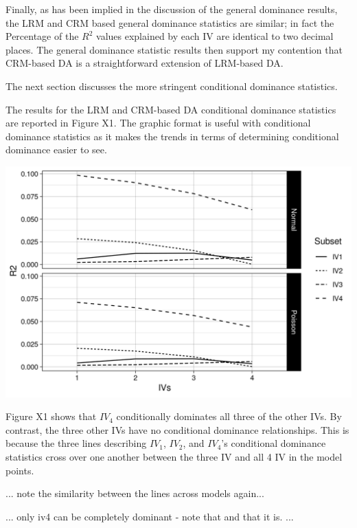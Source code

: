 \documentclass[ShortAfour,times,sageapa]{sagej}
\begin{document}
	Finally, as has been implied in the discussion of the general dominance results, the LRM and CRM based general dominance statistics are similar; in fact the Percentage of the $R^2$ values explained by each IV are identical to two decimal places.
	The general dominance statistic results then support my contention that CRM-based DA is a straightforward extension of LRM-based DA.
	
	The next section discusses the more stringent conditional dominance statistics.
	
	The results for the LRM and CRM-based DA conditional dominance statistics are reported in Figure X1. 
	The graphic format is useful with conditional dominance statistics as it makes the trends in terms of determining conditional dominance easier to see.
	 
	\includegraphics{includes/condit_gph}
	
	Figure X1 shows that $IV_4$ conditionally dominates all three of the other IVs.
	By contrast, the three other IVs have no conditional dominance relationships.
	This is because the three lines describing $IV_1$, $IV_2$, and $IV_4$'s conditional dominance statistics cross over one another between the three IV and all 4 IV in the model points.
	
	... note the similarity between the lines across models again...
	
	... only iv4 can be completely dominant - note that and that it is. ...
	
\end{document}
